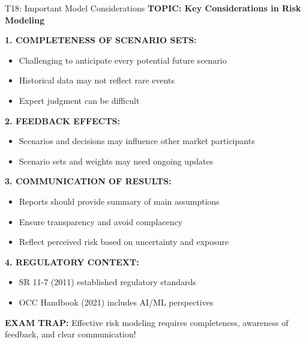 \documentclass[8pt]{beamer}
\begin{document}
	\begin{frame}{T18: Important Model Considerations}
		\fontsize{6.5}{7.5}\selectfont
		\textbf{TOPIC: Key Considerations in Risk Modeling}
		
		\vspace{0.1cm}
		\textbf{1. COMPLETENESS OF SCENARIO SETS:}
		\begin{itemize}
			\item Challenging to anticipate every potential future scenario
			\item Historical data may not reflect rare events
			\item Expert judgment can be difficult
		\end{itemize}
		
		\vspace{0.1cm}
		\textbf{2. FEEDBACK EFFECTS:}
		\begin{itemize}
			\item Scenarios and decisions may influence other market participants
			\item Scenario sets and weights may need ongoing updates
		\end{itemize}
		
		\vspace{0.1cm}
		\textbf{3. COMMUNICATION OF RESULTS:}
		\begin{itemize}
			\item Reports should provide summary of main assumptions
			\item Ensure transparency and avoid complacency
			\item Reflect perceived risk based on uncertainty and exposure
		\end{itemize}
		
		\vspace{0.1cm}
		\textbf{4. REGULATORY CONTEXT:}
		\begin{itemize}
			\item SR 11-7 (2011) established regulatory standards
			\item OCC Handbook (2021) includes AI/ML perspectives
		\end{itemize}
		
		\textcolor{myred}{\textbf{EXAM TRAP:}} Effective risk modeling requires \textcolor{myblue}{completeness, awareness of feedback, and clear communication}!
	\end{frame}
	
\end{document}
